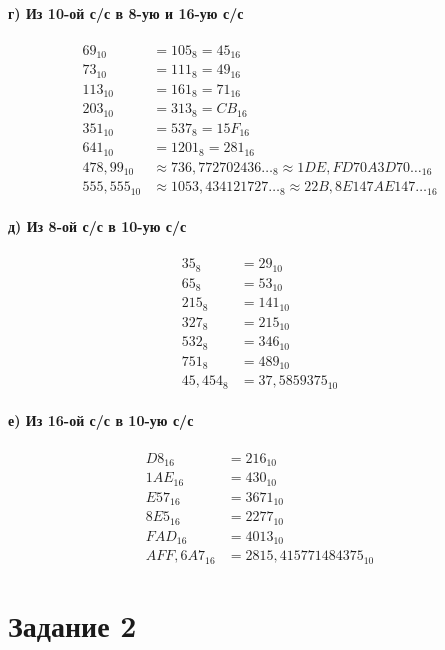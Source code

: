 \documentclass[a4paper,12pt]{article}
\begin{document}
\paragraph{г) Из 10-ой с/с в 8-ую и 16-ую с/с}

$$
\begin{aligned}
69_{10} &= 105_8 = 45_{16} \\
73_{10} &= 111_8 = 49_{16} \\
113_{10} &= 161_8 = 71_{16} \\
203_{10} &= 313_8 = CB_{16} \\
351_{10} &= 537_8 = 15F_{16} \\
641_{10} &= 1201_8 = 281_{16} \\
478{,}99_{10} &\approx 736{,}772702436\ldots_8
\approx 1DE{,}FD70A3D70\ldots_{16} \\
555{,}555_{10} &\approx 1053{,}434121727\ldots_8
\approx 22B{,}8E147AE147\ldots_{16}
\end{aligned}
$$

\paragraph{д) Из 8-ой с/с в 10-ую с/с}

$$
\begin{aligned}
35_8 &= 29_{10} \\
65_8 &= 53_{10} \\
215_8 &= 141_{10} \\
327_8 &= 215_{10} \\
532_8 &= 346_{10} \\
751_8 &= 489_{10} \\
45{,}454_8 &= 37{,}5859375_{10}
\end{aligned}
$$

\paragraph{е) Из 16-ой с/с в 10-ую с/с}

$$
\begin{aligned}
D8_{16} &= 216_{10} \\
1AE_{16} &= 430_{10} \\
E57_{16} &= 3671_{10} \\
8E5_{16} &= 2277_{10} \\
FAD_{16} &= 4013_{10} \\
AFF{,}6A7_{16} &= 2815{,}415771484375_{10}
\end{aligned}
$$

\section*{Задание 2}
\end{document}
